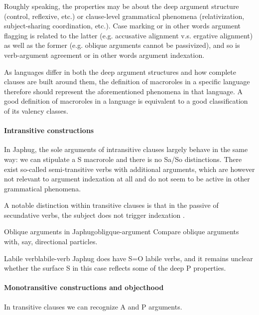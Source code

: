\documentclass[a4paper, oneside, 12pt]{report}
\newcommand*{\citesec}[1]{\S~{#1}}
\begin{document}
Roughly speaking, the properties may be about the deep argument structure
(control, reflexive, etc.) or clause-level grammatical phenomena
(relativization, subject-sharing coordination, etc.).
Case marking or in other words argument flagging 
is related to the latter (e.g. accusative alignment v.s. ergative alignment)
as well as the former (e.g. oblique arguments cannot be passivized),
and so is verb-argument agreement or in other words argument indexation.

As languages differ in both the deep argument structures
and how complete clauses are built around them,
the definition of macroroles in a specific language therefore should represent 
the aforementioned phenomena in that language.
A good definition of macroroles in a language
is equivalent to a good classification of its valency classes.

\paragraph*{Intransitive constructions}
In Japhug, the sole arguments of intransitive clauses largely behave in the same way:
we can stipulate a S macrorole and there is no Sa/So distinctions. 
There exist so-called semi-transitive verbs with additional arguments,
which are however not relevant to argument indexation at all
\citep[\citesec{14.2.5}]{jacques2021grammar}
and do not seem to be active in other grammatical phenomena.

A notable distinction within transitive clauses
is that in the passive of secundative verbs,
the subject does not trigger indexation
\citep[\citesec{18.1.4}]{jacques2021grammar}.

\begin{todobox}{Oblique arguments in Japhug}{obligque-argument}
    Compare oblique arguments with, say, directional particles.
\end{todobox}

\begin{todobox}{Labile verb}{labile-verb}
    Japhug does have S=O labile verbs,
    and it remains unclear whether the surface S in this case
    reflects some of the deep P properties. 
\end{todobox}

\paragraph*{Monotransitive constructions and objecthood}
\label{sec:grammatical.clause.internal.monotransitive}
In transitive clauses we can recognize A and P arguments.
\end{document}
